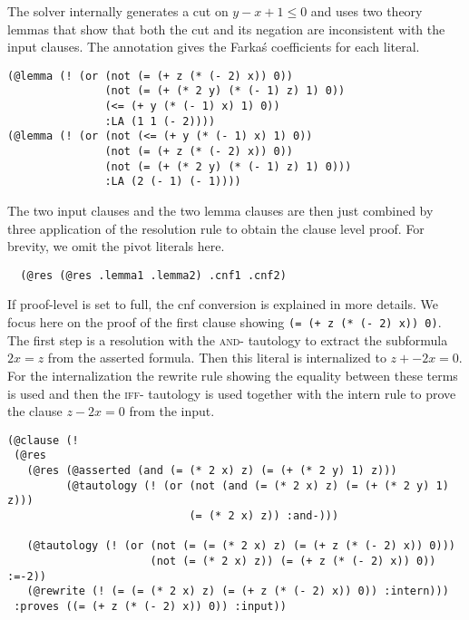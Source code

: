 \documentclass[a4paper]{article}
\newcommand\smtlib[1]{\texttt{#1}}
\begin{document}
The solver internally generates a cut on $y-x +1 \leq 0$ and uses two
theory lemmas that show that both the cut and its negation are
inconsistent with the input clauses.  The annotation gives the
Farka\'{s} coefficients for each literal.
\begin{verbatim}
(@lemma (! (or (not (= (+ z (* (- 2) x)) 0))
               (not (= (+ (* 2 y) (* (- 1) z) 1) 0))
               (<= (+ y (* (- 1) x) 1) 0))
               :LA (1 1 (- 2))))
(@lemma (! (or (not (<= (+ y (* (- 1) x) 1) 0))
               (not (= (+ z (* (- 2) x)) 0))
               (not (= (+ (* 2 y) (* (- 1) z) 1) 0)))
               :LA (2 (- 1) (- 1))))
\end{verbatim}

The two input clauses and the two lemma clauses are then just combined by
three application of the resolution rule to obtain the clause level proof.
For brevity, we omit the pivot literals here.

\begin{verbatim}
  (@res (@res .lemma1 .lemma2) .cnf1 .cnf2)
\end{verbatim}

If proof-level is set to full, the cnf conversion is explained in more
details.  We focus here on the proof of the first clause showing
\smtlib{(= (+ z (* (- 2) x)) 0)}.  The first step is a resolution with
the \textsc{and-} tautology to extract the subformula $2x=z$ from the
asserted formula.  Then this literal is internalized to $z + -2x = 0$.
For the internalization the rewrite rule showing the equality between
these terms is used and then the \textsc{iff-} tautology is used
together with the intern rule to prove the clause $z-2x=0$ from the
input.

\begin{verbatim}
(@clause (!
 (@res 
   (@res (@asserted (and (= (* 2 x) z) (= (+ (* 2 y) 1) z)))
         (@tautology (! (or (not (and (= (* 2 x) z) (= (+ (* 2 y) 1) z)))
                            (= (* 2 x) z)) :and-)))

   (@tautology (! (or (not (= (= (* 2 x) z) (= (+ z (* (- 2) x)) 0)))
                      (not (= (* 2 x) z)) (= (+ z (* (- 2) x)) 0)) :=-2))
   (@rewrite (! (= (= (* 2 x) z) (= (+ z (* (- 2) x)) 0)) :intern)))
 :proves ((= (+ z (* (- 2) x)) 0)) :input))
\end{verbatim}
\end{document}
